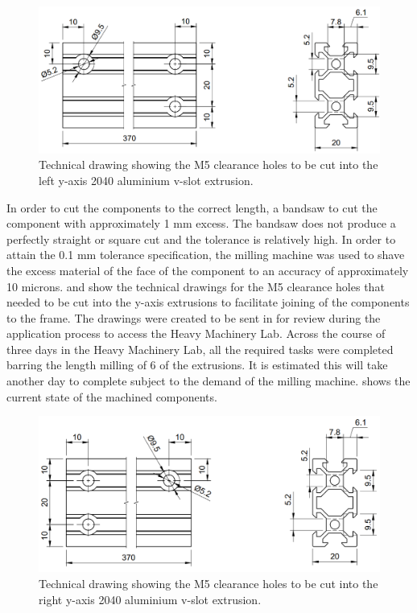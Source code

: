 \begin{figure}[H]
	\centering
	\includegraphics[width=0.7\linewidth]{figures/202108/hg2-001-drawing.png}
	\caption{Technical drawing showing the M5 clearance holes to be cut into the left y-axis 2040 aluminium v-slot extrusion.}
	\label{fig:hg2-001-drawing}
\end{figure}

In order to cut the components to the correct length, a bandsaw to cut the component with approximately 1 mm excess. The bandsaw does not produce a perfectly straight or square cut and the tolerance is relatively high. In order to attain the 0.1 mm tolerance specification, the milling machine was used to shave the excess material of the face of the component to an accuracy of approximately 10 microns.  and  show the technical drawings for the M5 clearance holes that needed to be cut into the y-axis extrusions to facilitate joining of the components to the frame. The drawings were created to be sent in for review during the application process to access the Heavy Machinery Lab. Across the course of three days in the Heavy Machinery Lab, all the required tasks were completed barring the length milling of 6 of the extrusions. It is estimated this will take another day to complete subject to the demand of the milling machine.  shows the current state of the machined components.

\begin{figure}[H]
	\centering
	\includegraphics[width=0.7\linewidth]{figures/202108/hg2-002-drawing.png}
	\caption{Technical drawing showing the M5 clearance holes to be cut into the right y-axis 2040 aluminium v-slot extrusion.}
	\label{fig:hg2-002-drawing}
\end{figure}

